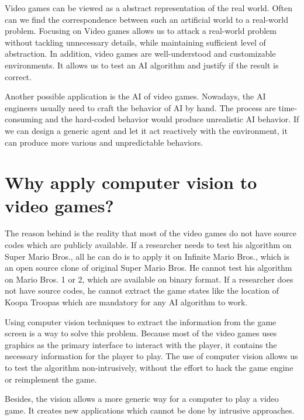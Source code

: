 Video games can be viewed as a abstract representation of the real world. Often can we find the 
correspondence between such an artificial world to a real-world problem\cite{KeepAway}.
Focusing on Video games allows us to attack a real-world problem without tackling unnecessary details, while maintaining sufficient 
level of abstraction. In addition, video games are well-understood and customizable environments. 
It allows us to test an AI algorithm and justify if the result is correct\cite{Yavar}.

Another possible application is the AI of video games.
Nowadays, the AI engineers usually need to craft the behavior of AI by hand. 
The process are time-consuming and the hard-coded behavior would produce unrealistic AI behavior.
If we can design a generic agent and let it act reactively with the environment, it can produce 
more various and unpredictable behaviors.

\section{Why apply computer vision to video games?}

The reason behind is the reality that most of the video games do not have source codes which are publicly available.
If a researcher needs to test his algorithm on Super Mario Bros., all he can do is to apply it on Infinite Mario Bros.,
which is an open source clone of original Super Mario Bros. He cannot test his algorithm on Mario Bros. 1 or 2, which are available
on binary format. If a researcher does not have source codes, he cannot extract the game states like the location
of Koopa Troopas which are mandatory for any AI algorithm to work. 

Using computer vision techniques to extract the information from the game screen is a way to solve this problem.
Because most of the video games uses graphics as the primary interface to interact with the player, it contains
the necessary information for the player to play. The use of computer vision allows us to test the algorithm
non-intrusively, without the effort to hack the game engine or reimplement the game.

Besides, the vision allows a more generic way for a computer to play a video game. It creates 
new applications which cannot be done by intrusive approaches.

